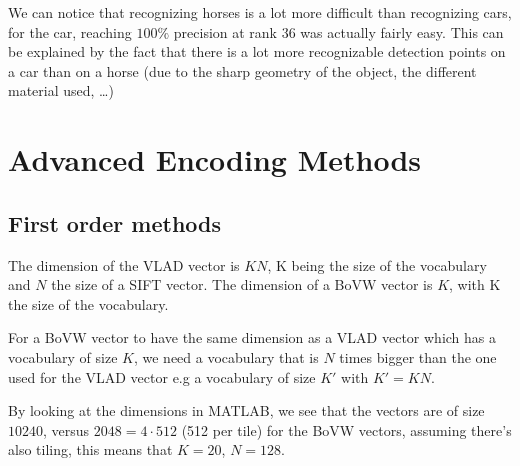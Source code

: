 \documentclass{article}
\begin{document}
We can notice that recognizing horses is a lot more difficult than
recognizing cars, for the car, reaching $100\%$ precision at rank 36
was actually fairly easy. This can be explained by the fact that there
is a lot more recognizable detection points on a car than on a horse
(due to the sharp geometry of the object, the different material used,
\dots)

\clearpage

\section{Advanced Encoding Methods}

\subsection{First order methods}


The dimension of the VLAD vector is $K N$, K being the size of
the vocabulary and $N$ the size of a SIFT vector.
The dimension of a BoVW vector is $K$, with K the size of the
vocabulary.

For a BoVW vector to have the same dimension as a VLAD vector which
has a vocabulary of size $K$, we need a vocabulary that is $N$ times
bigger than the one used for the VLAD vector e.g a vocabulary of size
$K'$ with $K' = K N$.


By looking at the dimensions in MATLAB, we see that the vectors are of
size $10240$, versus $2048 = 4 \cdot 512$ (512 per tile) for the BoVW
vectors, assuming there's also tiling, this means that $K = 20$,
$N = 128$.

\end{document}
